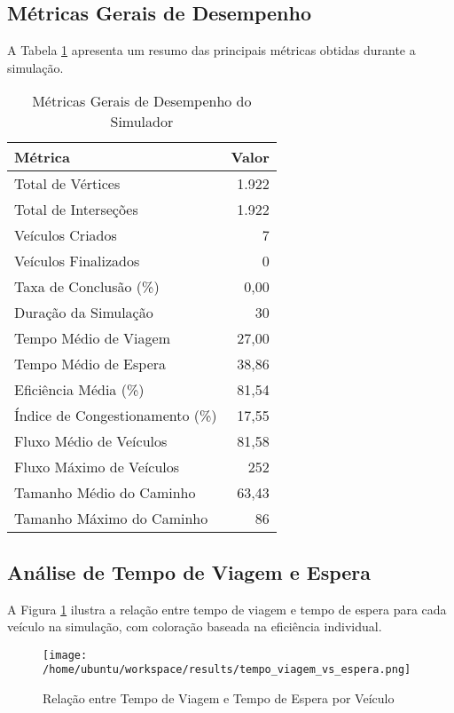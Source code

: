 \documentclass[12pt,a4paper]{article}
\begin{document}
\subsection{Métricas Gerais de Desempenho}

A Tabela \ref{tab:metricas_gerais} apresenta um resumo das principais métricas obtidas durante a simulação.

\begin{table}[H]
\centering
\caption{Métricas Gerais de Desempenho do Simulador}
\label{tab:metricas_gerais}
\begin{tabular}{lr}
\toprule
\textbf{Métrica} & \textbf{Valor} \\
\midrule
Total de Vértices & 1.922 \\
Total de Interseções & 1.922 \\
Veículos Criados & 7 \\
Veículos Finalizados & 0 \\
Taxa de Conclusão (\%) & 0,00 \\
Duração da Simulação & 30 \\
Tempo Médio de Viagem & 27,00 \\
Tempo Médio de Espera & 38,86 \\
Eficiência Média (\%) & 81,54 \\
Índice de Congestionamento (\%) & 17,55 \\
Fluxo Médio de Veículos & 81,58 \\
Fluxo Máximo de Veículos & 252 \\
Tamanho Médio do Caminho & 63,43 \\
Tamanho Máximo do Caminho & 86 \\
\bottomrule
\end{tabular}
\end{table}

\subsection{Análise de Tempo de Viagem e Espera}

A Figura \ref{fig:tempo_viagem_espera} ilustra a relação entre tempo de viagem e tempo de espera para cada veículo na simulação, com coloração baseada na eficiência individual.

\begin{figure}[H]
\centering
\texttt{[image: /home/ubuntu/workspace/results/tempo\_viagem\_vs\_espera.png]}
\caption{Relação entre Tempo de Viagem e Tempo de Espera por Veículo}
\label{fig:tempo_viagem_espera}
\end{figure}
\end{document}
